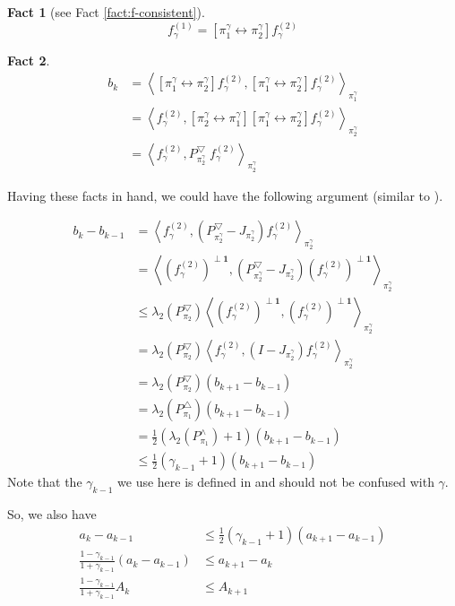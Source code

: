 \documentclass{article}
\newtheorem{fact}{Fact}[section]
\def\Op#1#2{\left[#1 \leftrightarrow #2\right]}
\def\<{\left\langle}
\def\>{\right\rangle}
\begin{document}
\begin{fact}[see Fact \ref{fact:f-consistent}]
  \[f^{(1)}_\gamma = \Op{\pi_1^\gamma}{\pi_2^\gamma} f^{(2)}_\gamma\]
\end{fact}
\begin{fact}
  \begin{align*}
    b_k
    &= \< \Op{\pi_1^\gamma}{\pi_2^\gamma} f^{(2)}_\gamma, \Op{\pi_1^\gamma}{\pi_2^\gamma} f^{(2)}_\gamma\>_{\pi_1^\gamma} \\
    &= \< f^{(2)}_\gamma, \Op{\pi_2^\gamma}{\pi_1^\gamma} \Op{\pi_1^\gamma}{\pi_2^\gamma} f^{(2)}_\gamma\>_{\pi_2^\gamma} \\
    &= \< f^{(2)}_\gamma, P_{\pi_2^\gamma}^{\bigtriangledown}\; f^{(2)}_\gamma\>_{\pi_2^\gamma}
  \end{align*}
\end{fact}

Having these facts in hand, we could have the following argument (similar to \cite{alev2020improved}).

\begin{align*}
  b_{k} - b_{k-1}
  &= \<f^{(2)}_\gamma, (P_{\pi_2^\gamma}^{\bigtriangledown} - J_{\pi_2^\gamma})f^{(2)}_\gamma\>_{\pi_2^\gamma} \\
  &= \<(f^{(2)}_\gamma)^{\perp \mathbf{1}}, (P_{\pi_2^\gamma}^{\bigtriangledown} - J_{\pi_2^\gamma})(f^{(2)}_\gamma)^{\perp \mathbf{1}}\>_{\pi_2^\gamma} \\
  &\leq \lambda_2(P_{\pi_2}^\bigtriangledown)\<(f^{(2)}_\gamma)^{\perp \mathbf{1}}, (f^{(2)}_\gamma)^{\perp \mathbf{1}}\>_{\pi_2^\gamma} \\
  &= \lambda_2(P_{\pi_2}^\bigtriangledown)\<f^{(2)}_\gamma, (I - J_{\pi_2^\gamma}) f^{(2)}_\gamma\>_{\pi_2^\gamma} \\
  &= \lambda_2(P_{\pi_2}^\bigtriangledown) (b_{k+1} - b_{k-1}) \\
  &= \lambda_2(P_{\pi_1}^\bigtriangleup) (b_{k+1} - b_{k-1}) \\
  &= \frac{1}{2}(\lambda_2(P_{\pi_1}^\land) + 1) (b_{k+1} - b_{k-1}) \\
  &\leq \frac{1}{2}(\gamma_{k-1} + 1) (b_{k+1} - b_{k-1})
\end{align*}
Note that the $\gamma_{k-1}$ we use here is defined in \cite{alev2020improved} and should not be confused with $\gamma$.

So, we also have
\begin{align*}
  a_k - a_{k-1} &\leq \frac{1}{2}(\gamma_{k-1} + 1) (a_{k+1} - a_{k-1}) \\
  \frac{1 - \gamma_{k-1}}{1 + \gamma_{k-1}} (a_k - a_{k-1}) &\leq a_{k+1} - a_k \\
  \frac{1 - \gamma_{k-1}}{1 + \gamma_{k-1}} A_k & \leq A_{k+1}
\end{align*}
\end{document}
